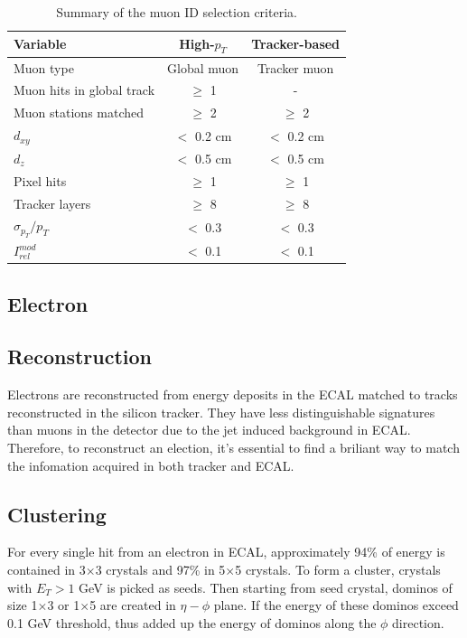 \begin{table}[h]
  \begin{center}
    \begin{tabular}{|l|c|c|}
      \hline
      Variable & High-$p_{T}$ & Tracker-based \\ \hline
      Muon type & Global muon & Tracker muon \\
      Muon hits in global track & $\geq$ 1 & - \\
      Muon stations matched & $\geq$ 2 & $\geq$ 2 \\
      $d_{xy}$ & $<$ 0.2 cm & $<$ 0.2 cm\\
      $d_{z}$ & $<$ 0.5 cm & $<$ 0.5 cm\\
      Pixel hits & $\geq$ 1 & $\geq$ 1 \\
      Tracker layers & $\geq$ 8 & $\geq$ 8 \\
      $\sigma_{p_{T}}/p_{T}$ & $<$ 0.3 & $<$ 0.3 \\ \hline
      $I_{rel}^{mod}$  & $<$ 0.1 & $<$ 0.1 \\
      \hline
    \end{tabular}
    \caption{\label{tab:MuonIDtable} Summary of the muon ID selection criteria.}
  \end{center}
\end{table}

\newpage
\subsection{Electron}

\subsection*{Reconstruction}
Electrons are reconstructed from energy deposits in the ECAL matched to tracks reconstructed in the silicon tracker. They have less distinguishable signatures than muons in the detector due to the jet induced background in ECAL. Therefore, to reconstruct an election, it's essential to find a briliant way to match the infomation acquired in both tracker and ECAL.

\subsection*{Clustering}
For every single hit from an electron in ECAL, approximately 94\% of energy is contained in 3$\times$3 crystals and 97\% in 5$\times$5 crystals. To form a cluster, crystals with $E_{T} > 1$ GeV is picked as seeds. Then starting from seed crystal, dominos of size 1$\times$3 or 1$\times$5 are created in $\eta-\phi$ plane. If the energy of these dominos exceed 0.1 GeV threshold, thus added up the energy of dominos along the $\phi$ direction.

